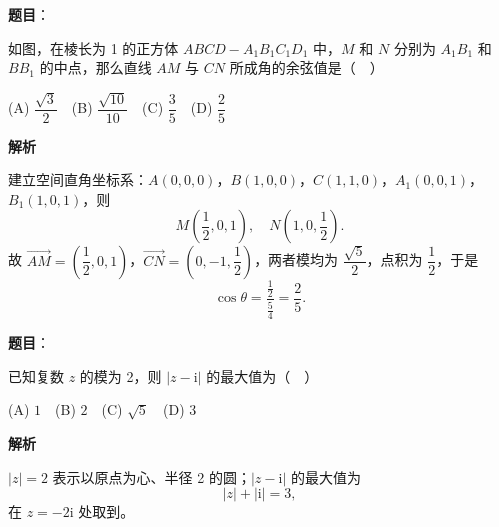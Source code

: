 \begin{answer}

\textbf{题目}：

如图，在棱长为 1 的正方体 \(ABCD-A_1B_1C_1D_1\) 中，\(M\) 和 \(N\) 分别为 \(A_1B_1\) 和 \(BB_1\) 的中点，那么直线 \(AM\) 与 \(CN\) 所成角的余弦值是（　）
\nopagebreak[4]
\begin{center}\end{center}
\nopagebreak[4]
(A) \(\dfrac{\sqrt{3}}{2}\)　(B) \(\dfrac{\sqrt{10}}{10}\)　(C) \(\dfrac{3}{5}\)　(D) \(\dfrac{2}{5}\)

\textbf{解析}

建立空间直角坐标系：\(A(0,0,0)\)，\(B(1,0,0)\)，\(C(1,1,0)\)，\(A_1(0,0,1)\)，\(B_1(1,0,1)\)，则
\nopagebreak[4]
\[
M\left(\frac12,0,1\right),\quad N\left(1,0,\frac12\right).
\]
故 \(\overrightarrow{AM}=\left(\dfrac12,0,1\right)\)，\(\overrightarrow{CN}=\left(0,-1,\dfrac12\right)\)，两者模均为 \(\dfrac{\sqrt5}{2}\)，点积为 \(\dfrac12\)，于是
\nopagebreak[4]
\[
\cos\theta=\frac{\frac12}{\frac54}=\frac25.
\]


\end{answer}
\begin{answer}

\textbf{题目}：

已知复数 \(z\) 的模为 2，则 \(|z-\mathrm{i}|\) 的最大值为（　）

(A) \(1\)　(B) \(2\)　(C) \(\sqrt{5}\)　(D) \(3\)

\textbf{解析}

\(|z|=2\) 表示以原点为心、半径 2 的圆；\(|z-\mathrm{i}|\) 的最大值为
\nopagebreak[4]
\[
|z|+|\mathrm{i}|=3,
\]
在 \(z=-2\mathrm{i}\) 处取到。


\end{answer}
